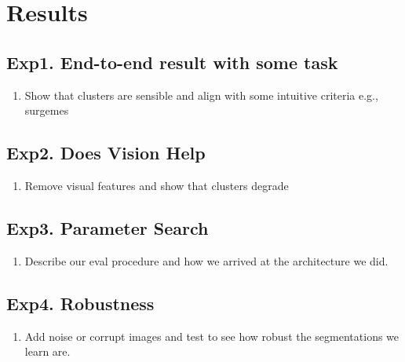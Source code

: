\section{Results}
\subsection{Exp1. End-to-end result with some task}

\begin{enumerate}
\item Show that clusters are sensible and align with some intuitive criteria e.g., surgemes
\end{enumerate}

\subsection{Exp2. Does Vision Help}

\begin{enumerate}
\item Remove visual features and show that clusters degrade
\end{enumerate}

\subsection{Exp3. Parameter Search}

\begin{enumerate}
\item Describe our eval procedure and how we arrived at the architecture we did.
\end{enumerate}

\subsection{Exp4. Robustness}
\begin{enumerate}
\item Add noise or corrupt images and test to see how robust the segmentations we learn are.
\end{enumerate}
